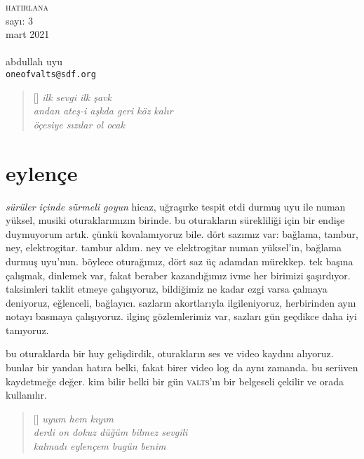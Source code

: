 \documentclass[a4paper, twocolumn, openright]{memoir}
\begin{document}
\thispagestyle{plain}
\noindent
{\HUGE\textsc{hatirlana}\\\small{}sayı: 3\\mart 2021}\\\\
{\small{}abdullah uyu\\\texttt{oneofvalts@sdf.org}}
\bigskip
{}
\begin{verse}[\versewidth]
  \itshape{}
  ilk sevgi ilk şavk\\
  andan ateş-i aşkda geri köz kalır\\
  öçesiye sızılar ol ocak
\end{verse}
\section{eylençe}
\textit{sürüler içinde sürmeli goyun} hicaz, uğraşırke tespit etdi durmuş
uyu ile numan yüksel, musiki oturaklarımızın birinde. bu oturakların
sürekliliği için bir endişe duymuyorum artık. çünkü kovalamıyoruz bile.
dört sazımız var: bağlama, tambur, ney, elektrogitar. tambur aldım. ney
ve elektrogitar numan yüksel'in, bağlama durmuş uyu'nun. böylece
oturağımız, dört saz üç adamdan mürekkep. tek başına çalışmak, dinlemek
var, fakat beraber kazandığımız ivme her birimizi şaşırdıyor. taksimleri
taklit etmeye çalışıyoruz, bildiğimiz ne kadar ezgi varsa çalmaya
deniyoruz, eğlenceli, bağlayıcı. sazların akortlarıyla ilgileniyoruz,
herbirinden aynı notayı basmaya çalışıyoruz. ilginç gözlemlerimiz var,
sazları gün geçdikce daha iyi tanıyoruz.

bu oturaklarda bir huy gelişdirdik, oturakların ses ve video
kaydını alıyoruz. bunlar bir yandan hatıra belki, fakat birer video log da
aynı zamanda. bu serüven kaydetmeğe değer. kim bilir belki bir gün
\textsc{valts}'ın bir belgeseli çekilir ve orada kullanılır.
\begin{verse}[\versewidth]
  \itshape{}
  uyum hem kıyım\\
  derdi on dokuz düğüm bilmez sevgili\\
  kalmadı eylençem bugün benim
\end{verse}
\end{document}
